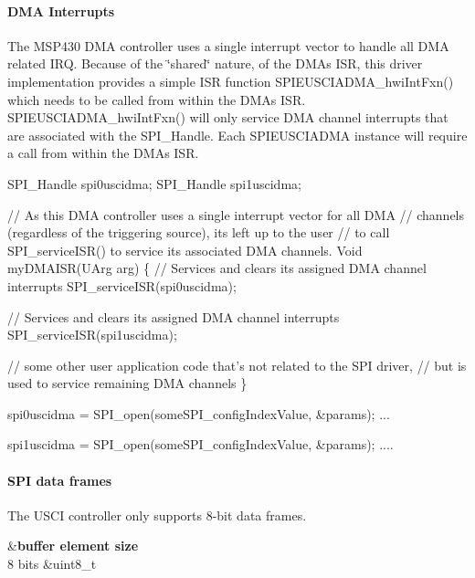\paragraph*{D\+M\+A Interrupts}

The M\+S\+P430 D\+M\+A controller uses a single interrupt vector to handle all D\+M\+A related I\+R\+Q. Because of the \char`\"{}shared\char`\"{} nature, of the D\+M\+A\textquotesingle{}s I\+S\+R, this driver implementation provides a simple I\+S\+R function S\+P\+I\+E\+U\+S\+C\+I\+A\+D\+M\+A\+\_\+hwi\+Int\+Fxn() which needs to be called from within the D\+M\+A\textquotesingle{}s I\+S\+R. S\+P\+I\+E\+U\+S\+C\+I\+A\+D\+M\+A\+\_\+hwi\+Int\+Fxn() will only service D\+M\+A channel interrupts that are associated with the S\+P\+I\+\_\+\+Handle. Each S\+P\+I\+E\+U\+S\+C\+I\+A\+D\+M\+A instance will require a call from within the D\+M\+A\textquotesingle{}s I\+S\+R.


\begin{DoxyCode}
SPI_Handle spi0uscidma;
SPI_Handle spi1uscidma;

\textcolor{comment}{// As this DMA controller uses a single interrupt vector for all DMA}
\textcolor{comment}{// channels (regardless of the triggering source), its left up to the user}
\textcolor{comment}{// to call SPI\_serviceISR() to service its associated DMA channels.}
Void myDMAISR(UArg arg)
\{
    \textcolor{comment}{// Services and clears its assigned DMA channel interrupts}
    SPI_serviceISR(spi0uscidma);

    \textcolor{comment}{// Services and clears its assigned DMA channel interrupts}
    SPI_serviceISR(spi1uscidma);

    \textcolor{comment}{// some other user application code that's not related to the SPI driver,}
    \textcolor{comment}{// but is used to service remaining DMA channels}
\}

spi0uscidma = SPI_open(someSPI\_configIndexValue, &params);
...

spi1uscidma = SPI_open(someSPI\_configIndexValue, &params);
....
\end{DoxyCode}


\paragraph*{S\+P\+I data frames}

The U\+S\+C\+I controller only supports 8-\/bit data frames.

\begin{TabularC}{2}
\hline
{}&{\bf buffer element size  }\\
8 bits &uint8\+\_\+t \\
\end{TabularC}
